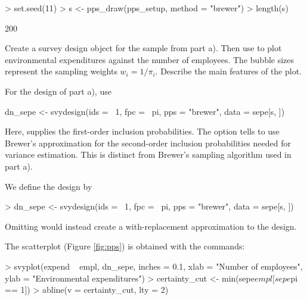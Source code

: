 \begin{Problem}
\begin{Subtask}
\begin{Solution}
\begin{Schunk}
\begin{Sinput}
> set.seed(11)
> s <- pps_draw(pps_setup, method = "brewer")
> length(s)
\end{Sinput}
\begin{Soutput}
[1] 200
\end{Soutput}
\end{Schunk}
    \end{Solution}

    \item Create a survey design object for the sample from part a). Then use
         to plot environmental expenditures against the number
        of employees. The bubble sizes represent the sampling weights
        $w_i = 1/\pi_i$. Describe the main features of the plot.

        \begin{Remark}
            For the \PPS design of part a), use

\begin{Scode}
dn_sepe <- svydesign(ids = ~1, fpc = ~pi, pps = "brewer",
                     data = sepe[s, ])
\end{Scode}

            Here,  supplies the first-order inclusion
            probabilities. The option  tells
             to use Brewer's approximation for the second-order
            inclusion probabilities needed for variance estimation. This is
            distinct from Brewer's sampling algorithm used in part a).
        \end{Remark}

    \begin{Solution}
        We define the design by

\begin{Schunk}
\begin{Sinput}
> dn_sepe <- svydesign(ids = ~1, fpc = ~pi, pps = "brewer",
                       data = sepe[s, ])
\end{Sinput}
\end{Schunk}

        Omitting  would instead create a with-replacement
        approximation to the design.

        The scatterplot (Figure \ref{fig:pps}) is obtained with the commands:

\begin{Schunk}
\begin{Sinput}
> svyplot(expend ~ empl, dn_sepe, inches = 0.1,
          xlab = "Number of employees",
          ylab = "Environmental expenditures")
> certainty_cut <- min(sepe$empl[sepe$pi == 1])
> abline(v = certainty_cut, lty = 2)
\end{Sinput}
\end{Schunk}


\end{Solution}
\end{Subtask}
\end{Problem}
